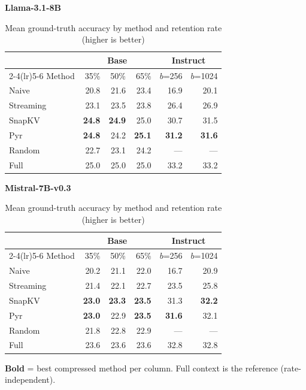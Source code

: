 \documentclass[10pt,letterpaper]{article}
\begin{document}
\begin{table}[H]
\centering
\small
\captionsetup{justification=centering}
\caption{Mean ground-truth accuracy by method and retention rate (higher is better)}
\label{tab:gt-allrates}
\begin{minipage}[t]{0.49\textwidth}
\centering
\textbf{Llama-3.1-8B}\\[0.4em]
\begin{tabular}{@{}lrrrrr@{}}
\toprule
& \multicolumn{3}{c}{Base} & \multicolumn{2}{c}{Instruct}\\
\cmidrule(lr){2-4}\cmidrule(lr){5-6}
Method & 35\% & 50\% & 65\% & $b$=256 & $b$=1024\\
\midrule
Naive      & 20.8 & 21.6 & 23.4 & 16.9 & 20.1\\
Streaming  & 23.1 & 23.5 & 23.8 & 26.4 & 26.9\\
SnapKV     & \textbf{24.8} & \textbf{24.9} & 25.0 & 30.7 & 31.5\\
Pyr        & \textbf{24.8} & 24.2 & \textbf{25.1} & \textbf{31.2} & \textbf{31.6}\\
Random     & 22.7 & 23.1 & 24.2 & --- & ---\\
\midrule
Full       & 25.0 & 25.0 & 25.0 & 33.2 & 33.2\\
\bottomrule
\end{tabular}
\end{minipage}%
\hfill
\begin{minipage}[t]{0.49\textwidth}
\centering
\textbf{Mistral-7B-v0.3}\\[0.4em]
\begin{tabular}{@{}lrrrrr@{}}
\toprule
& \multicolumn{3}{c}{Base} & \multicolumn{2}{c}{Instruct}\\
\cmidrule(lr){2-4}\cmidrule(lr){5-6}
Method & 35\% & 50\% & 65\% & $b$=256 & $b$=1024\\
\midrule
Naive      & 20.2 & 21.1 & 22.0 & 16.7 & 20.9\\
Streaming  & 21.4 & 22.1 & 22.7 & 23.5 & 25.8\\
SnapKV     & \textbf{23.0} & \textbf{23.3} & \textbf{23.5} & 31.3 & \textbf{32.2}\\
Pyr        & \textbf{23.0} & 22.9 & \textbf{23.5} & \textbf{31.6} & 32.1\\
Random     & 21.8 & 22.8 & 22.9 & --- & ---\\
\midrule
Full       & 23.6 & 23.6 & 23.6 & 32.8 & 32.8\\
\bottomrule
\end{tabular}
\end{minipage}
\par\smallskip
\textbf{Bold} = best compressed method per column. Full context is the reference (rate-independent).
\end{table}
\end{document}
